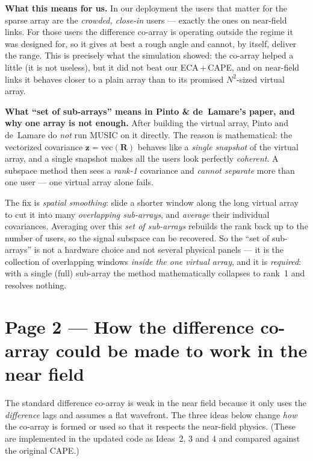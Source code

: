 \documentclass[10pt]{article}
\begin{document}
\textbf{What this means for us.} In our deployment the users that matter for the sparse array are the
\emph{crowded, close-in} users --- exactly the ones on near-field links. For those users the
difference co-array is operating outside the regime it was designed for, so it gives at best a rough
angle and cannot, by itself, deliver the range. This is precisely what the simulation showed: the
co-array helped a little (it is not useless), but it did not beat our ECA\,+\,CAPE, and on near-field
links it behaves closer to a plain array than to its promised $N^2$-sized virtual array.

\begin{keybox}
\textbf{What ``set of sub-arrays'' means in Pinto \& de~Lamare's paper, and why one array is not
enough.} After building the virtual array, Pinto and de~Lamare do \emph{not} run MUSIC on it
directly. The reason is mathematical: the vectorized covariance $\mathbf{z}=\mathrm{vec}(\mathbf{R})$
behaves like a \emph{single snapshot} of the virtual array, and a single snapshot makes all the
users look perfectly \emph{coherent}. A subspace method then sees a \emph{rank-1} covariance and
\emph{cannot separate} more than one user --- one virtual array alone fails.

The fix is \emph{spatial smoothing}: slide a shorter window along the long virtual array to cut it
into many \emph{overlapping sub-arrays}, and \emph{average} their individual covariances. Averaging
over this \emph{set of sub-arrays} rebuilds the rank back up to the number of users, so the signal
subspace can be recovered. So the ``set of sub-arrays'' is not a hardware choice and not several
physical panels --- it is the collection of overlapping windows \emph{inside the one virtual array},
and it is \emph{required}: with a single (full) sub-array the method mathematically collapses to
rank~1 and resolves nothing.
\end{keybox}

\newpage
\section*{Page 2 --- How the difference co-array could be made to work in the near field}

The standard difference co-array is weak in the near field because it only uses the
\emph{difference} lags and assumes a flat wavefront. The three ideas below change \emph{how} the
co-array is formed or used so that it respects the near-field physics. (These are implemented in the
updated code as Ideas~2, 3 and 4 and compared against the original CAPE.)
\end{document}
